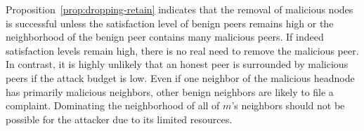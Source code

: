Proposition~\ref{prop:dropping-retain} indicates that the removal of malicious nodes is successful unless the satisfaction level of benign peers remains high or the neighborhood of the benign peer contains many malicious peers. 
If indeed satisfaction levels remain high, there is no real need to remove the malicious peer. In contrast, it is highly unlikely that an honest peer is surrounded by malicious peers if the attack budget is low. Even if one neighbor of the malicious headnode has primarily malicious neighbors, other benign neighbors are likely to file a complaint. Dominating the neighborhood of all of $m$'s neighbors should not be possible for the attacker due to its limited resources.

 
 